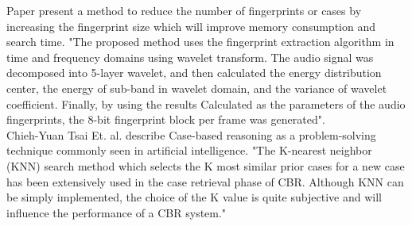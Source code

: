 Paper\cite{6497946} present a method to reduce the number of fingerprints or cases by increasing the fingerprint size which will improve memory consumption and search time.
"The proposed method uses the fingerprint extraction algorithm in time and frequency domains using wavelet transform. The audio signal was decomposed into 5-layer wavelet, and then calculated the energy distribution center, the energy of sub-band in wavelet domain, and the variance of wavelet coefficient. Finally, by using the results Calculated as the parameters of the audio fingerprints, the 8-bit fingerprint block per frame was generated"\cite{6497946}.\\


Chieh-Yuan Tsai Et. al. describe Case-based reasoning as a problem-solving technique
commonly seen in artificial intelligence\cite{5169353}. "The K-nearest neighbor (KNN) search
method which selects the K most similar prior cases for a new
case has been extensively used in the case retrieval phase of
CBR. Although KNN can be simply implemented, the choice of
the K value is quite subjective and will influence the
performance of a CBR system."
